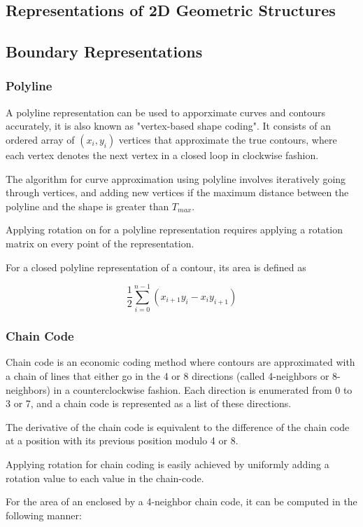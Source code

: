 \documentclass{article}
\begin{document}
\begin{multicols}{2}
\section{Representations of 2D Geometric Structures}
\subsection{Boundary Representations}
\subsubsection{Polyline}

A polyline representation can be used to apporximate curves and contours accurately, it is also known as "vertex-based shape coding". It consists of an ordered array of $(x_i, y_i)$ vertices that approximate the true contours, where each vertex denotes the next vertex in a closed loop in clockwise fashion.

The algorithm for curve approximation using polyline involves iteratively going through vertices, and adding new vertices if the maximum distance between the polyline and the shape is greater than $T_{max}$.

Applying rotation on for a polyline representation requires applying a rotation matrix on every point of the representation.

For a closed polyline representation of a contour, its area is defined as

$$
\frac{1}{2}\sum_{i=0}^{n-1}(x_{i+1}y_i - x_iy_{i+1})
$$

\subsubsection{Chain Code}

Chain code is an economic coding method where contours are approximated with a chain of lines that either go in the 4 or 8 directions (called 4-neighbors or 8-neighbors) in a counterclockwise fashion. Each direction is enumerated from 0 to 3 or 7, and a chain code is represented as a list of these directions.

The derivative of the chain code is equivalent to the difference of the chain code at a position with its previous position modulo 4 or 8.

Applying rotation for chain coding is easily achieved by uniformly adding a rotation value to each value in the chain-code.

For the area of an enclosed by a 4-neighbor chain code, it can be computed in the following manner:


\end{multicols}
\end{document}
